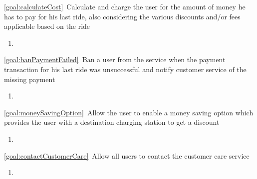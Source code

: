 \begin{description}
\begin{enumerate}[resume*]
   			\end{enumerate}
  		\item \ref{goal:calculateCost}\ Calculate and charge the user for the amount of money he has
  		to pay for his last ride, also considering the various discounts and/or fees applicable based on
  		the ride
  			\begin{enumerate}[resume*]
  				\item
   			\end{enumerate}
   		\item \ref{goal:banPaymentFailed}\ Ban a user from the service when the payment transaction
  		for his last ride was unsuccessful and notify customer service of the missing
  		payment
  			\begin{enumerate}[resume*]
  				\item
  			\end{enumerate}
  		\item \ref{goal:moneySavingOption}\ Allow the user to enable a money saving option which
  		provides the user with a destination charging station to get a discount
  			\begin{enumerate}[resume*]
  				\item
   			\end{enumerate}
  		\item \ref{goal:contactCustomerCare}\ Allow all users to contact the customer care service
  			\begin{enumerate}[resume*]
  				\item
   			\end{enumerate}
  	\end{description}

